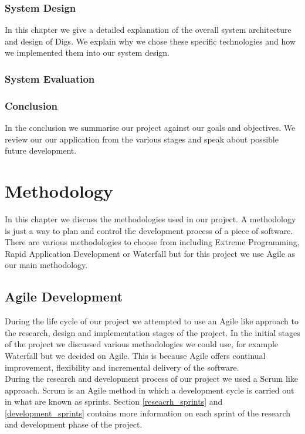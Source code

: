 \subsection{System Design}
In this chapter we give a detailed explanation of the overall system
architecture and design of Digs. We explain why we chose these specific technologies and how we implemented them into our system design.


\subsection{System Evaluation}



\subsection{Conclusion}
In the conclusion we summarise our project against our goals and objectives. We review our our application from the various stages and speak about possible future development.



\chapter{Methodology}
In this chapter we discuss the methodologies used in our project. A methodology is just a way to plan and control the development process of a piece of software. There are various methodologies to choose from including Extreme Programming, Rapid Application Development or Waterfall but for this project we use Agile as our main methodology.

\section{Agile Development}
During the life cycle of our project we attempted to use an Agile like approach to the research, design and implementation stages of the project. In the initial stages of the project we discussed various methodologies we could use, for example Waterfall but we decided on Agile. This is because Agile offers continual improvement, flexibility and incremental delivery of the software.  \\

\noindent During the research and development process of our project we used a Scrum like approach. Scrum is an Agile method in which a development cycle is carried out in what are known as sprints. Section \ref{reseacrh_sprints} and \ref{development_sprints} contains more information on each sprint of the research and development phase of the project. \\

